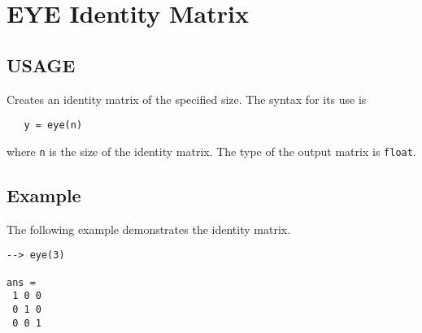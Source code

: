 \section{EYE Identity Matrix}

\subsection{USAGE}

Creates an identity matrix of the specified size.  The syntax for
its use is
\begin{verbatim}
   y = eye(n)
\end{verbatim}
where \verb|n| is the size of the identity matrix.  The type of the 
output matrix is \verb|float|.
\subsection{Example}

The following example demonstrates the identity matrix.
\begin{verbatim}
--> eye(3)

ans = 
 1 0 0 
 0 1 0 
 0 0 1 
\end{verbatim}
